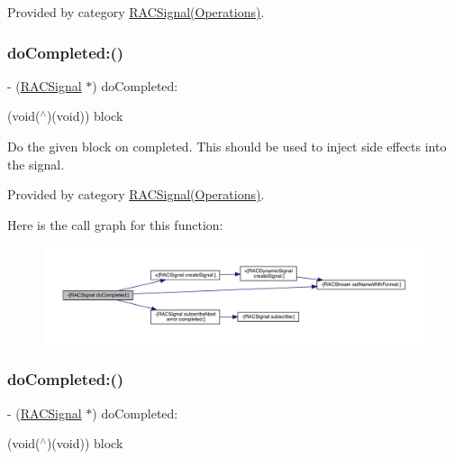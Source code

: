 Provided by category \mbox{\hyperlink{category_r_a_c_signal_07_operations_08_aa5b197f63d89c698c8cbfc749ea15440}{R\+A\+C\+Signal(\+Operations)}}.

\mbox{\label{interface_r_a_c_signal_af88fe4c330bad925ed164ad8f12bdcc8}} 
\subsubsection{\texorpdfstring{do\+Completed\+:()}{doCompleted:()}\hspace{0.1cm}{\footnotesize\ttfamily [1/3]}}
{\footnotesize\ttfamily -\/ (\mbox{\hyperlink{interface_r_a_c_signal}{R\+A\+C\+Signal}} $\ast$) do\+Completed\+: \begin{DoxyParamCaption}\item[{(void($^\wedge$)(void))}]{block }\end{DoxyParamCaption}}

Do the given block on {\ttfamily completed}. This should be used to inject side effects into the signal. 

Provided by category \mbox{\hyperlink{category_r_a_c_signal_07_operations_08_af88fe4c330bad925ed164ad8f12bdcc8}{R\+A\+C\+Signal(\+Operations)}}.

Here is the call graph for this function\+:\nopagebreak
\begin{figure}[H]
\begin{center}
\leavevmode
\includegraphics[width=350pt]{interface_r_a_c_signal_af88fe4c330bad925ed164ad8f12bdcc8_cgraph}
\end{center}
\end{figure}
\mbox{\label{interface_r_a_c_signal_af88fe4c330bad925ed164ad8f12bdcc8}} 
\subsubsection{\texorpdfstring{do\+Completed\+:()}{doCompleted:()}\hspace{0.1cm}{\footnotesize\ttfamily [2/3]}}
{\footnotesize\ttfamily -\/ (\mbox{\hyperlink{interface_r_a_c_signal}{R\+A\+C\+Signal}} $\ast$) do\+Completed\+: \begin{DoxyParamCaption}\item[{(void($^\wedge$)(void))}]{block }\end{DoxyParamCaption}}

